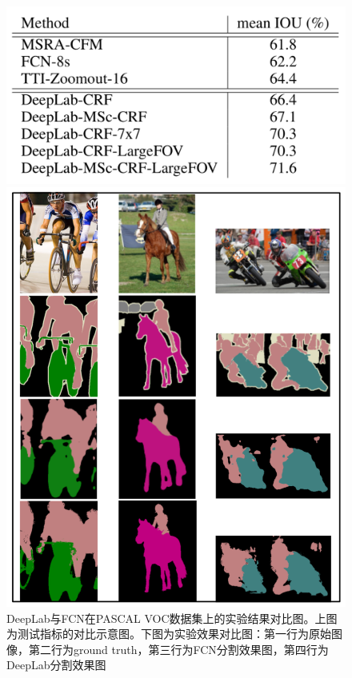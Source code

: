 \documentclass[cn]{elegantbook}
\begin{document}
\begin{figure}[!h]
	\centering
	\begin{minipage}[t]{0.85\textwidth}
		\centering
		\includegraphics[width=\textwidth]{images/deeplabvsfcn1}
	\end{minipage}
	\begin{minipage}[t]{0.85\textwidth}
		\centering
		\includegraphics[width=\textwidth]{images/deeplabvsfcn}
	\end{minipage}
	\caption{\label{deeplabvsfcn}DeepLab与FCN在PASCAL VOC数据集上的实验结果对比图。上图为测试指标的对比示意图。下图为实验效果对比图：第一行为原始图像，第二行为ground truth，第三行为FCN分割效果图，第四行为DeepLab分割效果图}
\end{figure}
\end{document}
